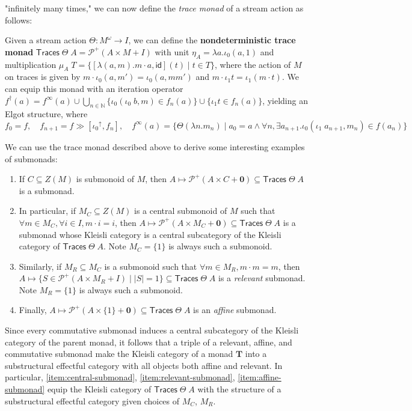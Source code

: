 \documentclass[acmsmall,screen,review]{acmart}
\newcommand{\mc}[1]{\ensuremath{\mathcal{#1}}}
\newcommand{\mb}[1]{\ensuremath{\mathbf{#1}}}
\newcommand{\ms}[1]{\ensuremath{\mathsf{#1}}}
\newcommand{\nats}{\mathbb{N}}
\newcommand{\upg}[2]{{#1}^{\uparrow #2}}
\begin{document}
"infinitely many times," we can now define the \textit{trace monad} of a stream
action as follows:
\begin{definition}
  Given a stream action \(\Theta: M^\omega \to I\), we can define the
  \textbf{nondeterministic trace monad} \(\ms{Traces}\;\Theta\;A = \mc{P}^+(A
  \times M + I)\) with unit \(\eta_A = \lambda a.\iota_0 (a, 1)\) and
  multiplication
  \(
    \mu_A\;T = \{[\lambda (a, m). m \cdot a, \ms{id}](t) \mid t \in T\}
  \),
  where the action of \(M\) on traces is given by \(m \cdot \iota_0 (a, m') =
  \iota_0 (a, mm')\) and \(m \cdot \iota_1 t = \iota_1 (m \cdot t)\). We can
  equip this monad with an iteration operator \(f^\dagger(a) = f^\infty(a) \cup
  \bigcup_{n \in \nats}\{\iota_0 (\iota_0\;b, m) \in f_n(a)\} \cup \{\iota_1 t
  \in f_n(a)\}\), yielding an Elgot structure, where
  \[
    f_0 = f, \quad f_{n + 1} = f \gg [\upg{\iota_0}{}, f_n], \quad
    f^\infty(a) = \{\Theta (\lambda n. m_n) \mid a_0 = a \land \forall n, \exists a_{n + 1}. \iota_0 (\iota_1\;a_{n + 1}, m_n) \in f(a_n)\}
  \]
\end{definition}
We can use the trace monad described above to derive some interesting examples
of submonads:
\begin{enumerate}
  \item If \(C \subseteq Z(M)\) is submonoid of \(M\), then \(A \mapsto
  \mc{P}^+(A \times C + \mb{0}) \subseteq \ms{Traces}\;\Theta\;A\) is a submonad.
  \item In particular, if \(M_C \subseteq Z(M)\) is a central submonoid of \(M\)
  such that \(\forall m \in M_C, \forall i \in I, m \cdot i = i\), then \(A
  \mapsto \mc{P}^+(A \times M_C + \mb{0}) \subseteq \ms{Traces}\;\Theta\;A\) is
  a submonad whose Kleisli category is a central subcategory of the Kleisli
  category of \(\ms{Traces}\;\Theta\;A\). Note \(M_C = \{1\}\) is always such a
  submonoid.
  \label{item:central-submonad}
  \item Similarly, if \(M_R \subseteq M_C\) is a submonoid such that \(\forall m
  \in M_R, m \cdot m = m\), then \(A \mapsto \{S \in \mc{P}^+(A \times M_R + I)
  \mid |S| = 1\} \subseteq \ms{Traces}\;\Theta\;A\) is a \textit{relevant}
  submonad. Note \(M_R = \{1\}\) is always such a submonoid.
  \label{item:relevant-submonad}
  \item Finally, \(A \mapsto \mc{P}^+(A \times \{1\} + \mb{0}) \subseteq
  \ms{Traces}\;\Theta\;A\) is an \textit{affine} submonad.
  \label{item:affine-submonad}
\end{enumerate}
Since every commutative submonad induces a central subcategory of the Kleisli
category of the parent monad, it follows that a triple of a relevant, affine,
and commutative submonad make the Kleisli category of a monad \(\mb{T}\) into a
substructural effectful category with all objects both affine and relevant. In
particular, \ref{item:central-submonad}, \ref{item:relevant-submonad},
\ref{item:affine-submonad} equip the Kleisli category of
\(\ms{Traces}\;\Theta\;A\) with the structure of a substructural effectful
category given choices of \(M_C\), \(M_R\).
\end{document}
